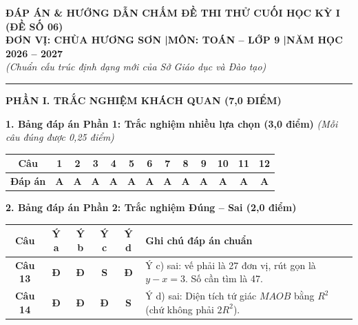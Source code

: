 \documentclass[11pt,a4paper]{article}
\begin{document}
\begin{center}
{\large\bfseries ĐÁP ÁN \& HƯỚNG DẪN CHẤM ĐỀ THI THỬ CUỐI HỌC KỲ I (ĐỀ SỐ 06)}\\[1.5mm]
{\bfseries ĐƠN VỊ: CHÙA HƯƠNG SƠN \quad|\quad MÔN: TOÁN -- LỚP 9 \quad|\quad NĂM HỌC 2026 -- 2027}\\[1mm]
\textit{(Chuẩn cấu trúc định dạng mới của Sở Giáo dục và Đào tạo)}
\end{center}

\vspace{1mm}
\hrule
\vspace{3mm}

\noindent
\textbf{\large PHẦN I. TRẮC NGHIỆM KHÁCH QUAN (7,0 ĐIỂM)}

\vspace{2mm}
\noindent
\textbf{1. Bảng đáp án Phần 1: Trắc nghiệm nhiều lựa chọn (3,0 điểm)} \textit{(Mỗi câu đúng được 0,25 điểm)}
\begin{center}
\begin{tabular}{|c|c|c|c|c|c|c|c|c|c|c|c|c|}
\hline
\textbf{Câu} & \textbf{1} & \textbf{2} & \textbf{3} & \textbf{4} & \textbf{5} & \textbf{6} & \textbf{7} & \textbf{8} & \textbf{9} & \textbf{10} & \textbf{11} & \textbf{12} \\
\hline
\textbf{Đáp án} & \textbf{A} & \textbf{A} & \textbf{A} & \textbf{A} & \textbf{A} & \textbf{A} & \textbf{A} & \textbf{A} & \textbf{A} & \textbf{A} & \textbf{A} & \textbf{A} \\
\hline
\end{tabular}
\end{center}

\vspace{2mm}
\noindent
\textbf{2. Bảng đáp án Phần 2: Trắc nghiệm Đúng -- Sai (2,0 điểm)}
\begin{center}
\begin{tabular}{|c|c|c|c|c|l|}
\hline
\textbf{Câu} & \textbf{Ý a} & \textbf{Ý b} & \textbf{Ý c} & \textbf{Ý d} & \textbf{Ghi chú đáp án chuẩn} \\
\hline
\textbf{Câu 13} & \textbf{Đ} & \textbf{Đ} & \textbf{S} & \textbf{Đ} & Ý c) sai: vế phải là 27 đơn vị, rút gọn là $y - x = 3$. Số cần tìm là 47. \\
\hline
\textbf{Câu 14} & \textbf{Đ} & \textbf{Đ} & \textbf{Đ} & \textbf{S} & Ý d) sai: Diện tích tứ giác $MAOB$ bằng $R^2$ (chứ không phải $2R^2$). \\
\hline
\end{tabular}
\end{center}
\end{document}
